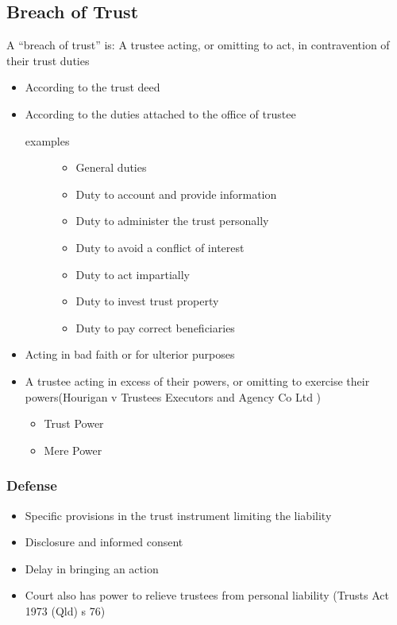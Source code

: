 \subsection*{Breach of Trust}
A “breach of trust” is: A trustee acting, or omitting to act, in contravention of their trust duties
\begin{itemize}
    \item According to the trust deed
    \item According to the duties attached to the office of trustee
        \begin{description}
            \item[examples]
                \begin{itemize}
                    \item General duties
                    \item Duty to account and provide information
                    \item Duty to administer the trust personally
                    \item Duty to avoid a conflict of interest
                    \item Duty to act impartially
                    \item Duty to invest trust property
                    \item Duty to pay correct beneficiaries
                \end{itemize}
        \end{description}
    \item Acting in bad faith or for ulterior purposes

    \item A trustee acting in excess of their powers, or omitting to exercise their powers(Hourigan v Trustees Executors and Agency Co Ltd )
        \begin{itemize}
            \item Trust Power
            \item Mere Power
        \end{itemize}
\end{itemize}

\subsubsection*{Defense}
\begin{itemize}
    \item Specific provisions in the trust instrument limiting the liability
    \item Disclosure and informed consent
        \item Delay in bringing an action
    \item  Court also has power to relieve trustees from personal liability (Trusts Act 1973 (Qld) s 76)

\end{itemize}

